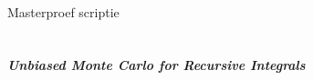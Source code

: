 \begin{titlepage}
    \begin{center}
        \ \
        \ \\
        \ \\
        \ \\
        \ \\
        \ \\
        \ \\
        \ \\
        \ \\
        \ \\
        \ \\
        \ \\
        \Large{M{\sc asterproef scriptie}}
        \ \\
        \ \\
        \ \\
        \huge{\bf{\em Unbiased Monte Carlo for Recursive Integrals}}
        \ \\
        \ \\
        \ \\
        \ \\
        \ \\

\end{center}
\end{titlepage}
